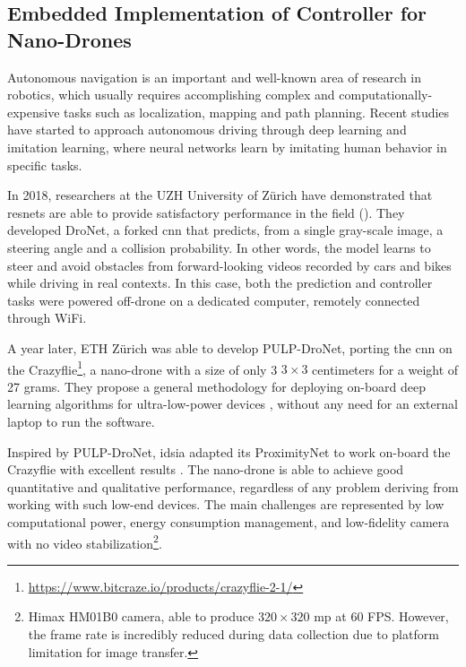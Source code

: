 \subsection{Embedded Implementation of Controller for Nano-Drones}
\label{subsec:sota-nicky}

Autonomous navigation is an important and well-known area of research in robotics, which usually requires accomplishing complex and computationally-expensive tasks such as localization, mapping and path planning. Recent studies have started to approach autonomous driving through deep learning and imitation learning\cite{imitation-learning}, where neural networks learn by imitating human behavior in specific tasks. 

\medskip

In 2018, researchers at the UZH University of Zürich have demonstrated that \gls{resnet}s are able to provide satisfactory performance in the field (\cite{Loquercio_2018}). They developed DroNet, a forked \gls{cnn} that predicts, from a single gray-scale image, a steering angle and a collision probability. In other words, the model learns to steer and avoid obstacles from forward-looking videos recorded by cars and bikes while driving in real contexts. In this case, both the prediction and controller tasks were powered off-drone on a dedicated computer, remotely connected through WiFi. 

A year later, ETH Zürich was able to develop PULP-DroNet, porting the \gls{cnn} on the Crazyflie\footnote{\url{https://www.bitcraze.io/products/crazyflie-2-1/}}, a nano-drone with a size of only 3 $3 \times 3$ centimeters for a weight of 27 grams. They propose a general methodology for deploying on-board deep learning algorithms for ultra-low-power devices \cite{palossi2019pulpdronetIoTJ}, without any need for an external laptop to run the software.

\medskip

Inspired by PULP-DroNet, \gls{idsia} adapted its ProximityNet to work on-board the Crazyflie with excellent results \cite{zimmerman2020thesis}. The nano-drone is able to achieve good quantitative and qualitative performance, regardless of any problem deriving from working with such low-end devices. The main challenges are represented by low computational power, energy consumption management, and low-fidelity camera with no video stabilization\footnote{Himax HM01B0 camera, able to produce $320 \times 320$ \gls{mp} at 60 FPS. However, the frame rate is incredibly reduced during data collection due to platform limitation for image transfer.}.




